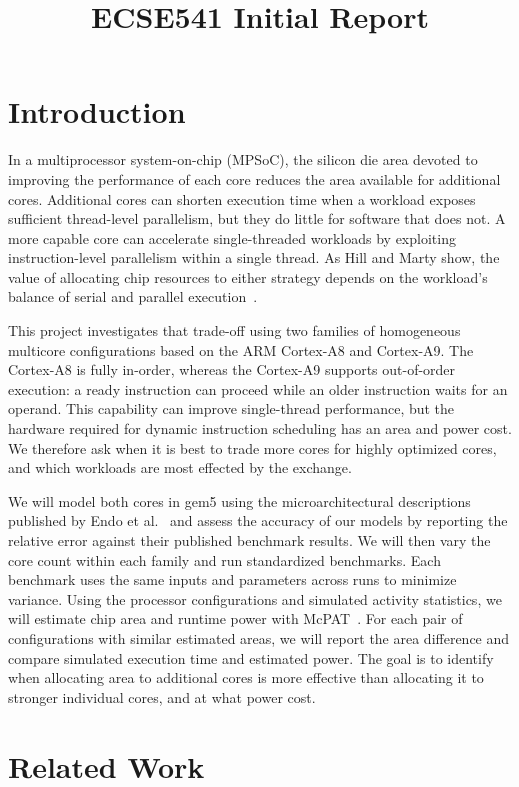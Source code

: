 \documentclass[conference,9pt]{IEEEtran}
\title{ECSE541 Initial Report}
\author{\IEEEauthorblockN{Ryan Edrissi, Yuchen Niu, Peng Peng, Trevor Piltch, Marcus Porfilio}
\IEEEauthorblockA{Department of Electrical and Computer Engineering, McGill University\\
845 Sherbrooke Street West, Montréal H3A 0G4}}
\begin{document}
\maketitle

\section{Introduction}
\label{sec:intro}
In a multiprocessor system-on-chip (MPSoC), the silicon die area devoted to improving the performance of each core reduces the area available for additional cores. Additional cores can shorten execution time when a workload exposes sufficient thread-level parallelism, but they do little for software that does not. A more capable core can accelerate single-threaded workloads by exploiting instruction-level parallelism within a single thread. As Hill and Marty show, the value of allocating chip resources to either strategy depends on the workload's balance of serial and parallel execution~\cite{4563876}.

This project investigates that trade-off using two families of homogeneous multicore configurations based on the ARM Cortex-A8 and Cortex-A9. The Cortex-A8 is fully in-order, whereas the Cortex-A9 supports out-of-order execution: a ready instruction can proceed while an older instruction waits for an operand. This capability can improve single-thread performance, but the hardware required for dynamic instruction scheduling has an area and power cost. We therefore ask when it is best to trade more cores for highly optimized cores, and which workloads are most effected by the exchange.

We will model both cores in gem5 using the microarchitectural descriptions published by Endo et al.~\cite{6893220} and assess the accuracy of our models by reporting the relative error against their published benchmark results. We will then vary the core count within each family and run standardized benchmarks. Each benchmark uses the same inputs and parameters across runs to minimize variance. Using the processor configurations and simulated activity statistics, we will estimate chip area and runtime power with McPAT~\cite{5375438}. For each pair of configurations with similar estimated areas, we will report the area difference and compare simulated execution time and estimated power. The goal is to identify when allocating area to additional cores is more effective than allocating it to stronger individual cores, and at what power cost.

\section{Related Work}
\end{document}
